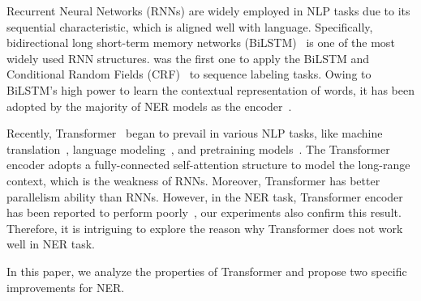 \documentclass[11pt,a4paper]{article}
\begin{document}
Recurrent Neural Networks (RNNs) are widely employed in NLP tasks due to its sequential characteristic, which is aligned well with language. Specifically, bidirectional long short-term memory networks (BiLSTM)~\cite{hochreiter1997long} is one of the most widely used RNN structures. \citep{huang2015bidirectional} was the first one to apply the BiLSTM and Conditional Random Fields (CRF)~\cite{lafferty2001conditional} to sequence labeling tasks. Owing to BiLSTM's high power to learn the contextual representation of words, it has been adopted by the majority of NER models as the encoder~\cite{ma2016end,lample2016neural,DBLP:conf/acl/ZhangLS18,gui2019lexicon}.

Recently, Transformer~\cite{vaswani2017attention} began to prevail in various NLP tasks, like machine translation~\cite{vaswani2017attention}, language modeling~\cite{radford2018improving}, and pretraining models~\cite{DBLP:journals/corr/abs-1810-04805}.
The Transformer encoder adopts a fully-connected self-attention structure to model the long-range context, which is the weakness of RNNs.
Moreover, Transformer has better parallelism ability than RNNs.
However, in the NER task, Transformer encoder has been reported to perform poorly~\cite{DBLP:conf/naacl/GuoQLSXZ19}, our experiments also confirm this result.
Therefore, it is intriguing to explore the reason why Transformer does not work well in NER task.

In this paper, we analyze the properties of Transformer and propose two specific improvements for NER.
\end{document}

